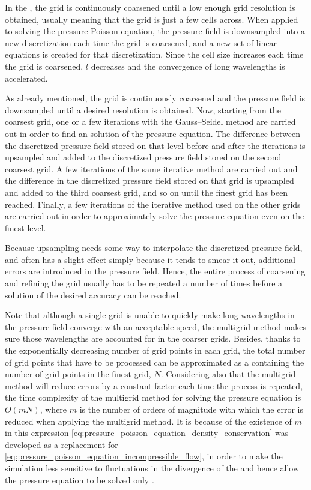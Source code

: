 In the , the grid is continuously coarsened until a low enough grid resolution is obtained, usually meaning that the grid is just a few cells across. When applied to solving the pressure Poisson equation, the pressure field is downsampled into a new discretization each time the grid is coarsened, and a new set of linear equations is created for that discretization. Since the cell size increases each time the grid is coarsened, $l$ decreases and the convergence of long wavelengths is accelerated.

As already mentioned, the grid is continuously coarsened and the pressure field is downsampled until a desired resolution is obtained. Now, starting from the coarsest grid, one or a few iterations with the Gauss--Seidel method are carried out in order to find an \approximate solution of the pressure equation. The difference between the discretized pressure field stored on that level before and after the iterations is upsampled and added to the discretized pressure field stored on the second coarsest grid. A few iterations of the same iterative method are carried out and the difference in the discretized pressure field stored on that grid is upsampled and added to the third coarsest grid, and so on until the finest grid has been reached. Finally, a few iterations of the iterative method used on the other grids are carried out in order to approximately solve the pressure equation even on the finest level.

Because upsampling needs some way to interpolate the discretized pressure field, and often has a slight  effect simply because it tends to smear it out, additional errors are introduced in the pressure field. Hence, the entire process of coarsening and refining the grid usually has to be repeated a number of times before a solution of the desired accuracy can be reached.

Note that although a single grid is unable to quickly make long wavelengths in the pressure field converge with an acceptable speed, the multigrid method makes sure those wavelengths are accounted for in the coarser grids. Besides, thanks to the exponentially decreasing number of grid points in each grid, the total number of grid points that have to be processed can be approximated as a  containing the number of grid points in the finest grid, $N$. Considering also that the multigrid method will reduce errors by a constant factor each time the process is repeated, the time complexity of the multigrid method for solving the pressure equation is $O(mN)$, where $m$ is the number of orders of magnitude with which the error is reduced when applying the multigrid method. It is because of the existence of $m$ in this expression \eqref{eq:pressure_poisson_equation_density_conservation} was developed as a replacement for \eqref{eq:pressure_poisson_equation_incompressible_flow}, in order to make the simulation less sensitive to fluctuations in the divergence of the  and hence allow the pressure equation to be solved only \approximately.

